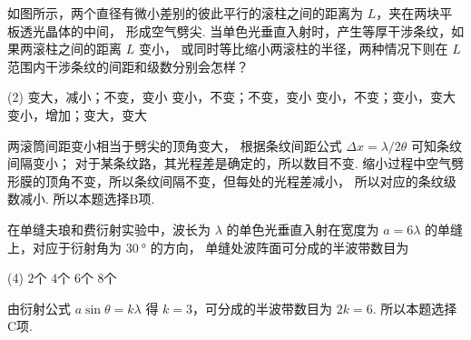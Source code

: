 \begin{textfig}
  \begin{problem}
    如图所示，两个直径有微小差别的彼此平行的滚柱之间的距离为 $L$，夹在两块平板透光晶体的中间，
    形成空气劈尖. 当单色光垂直入射时，产生等厚干涉条纹，如果两滚柱之间的距离 $L$ 变小，
    或同时等比缩小两滚柱的半径，两种情况下则在 $L$ 范围内干涉条纹的间距和级数分别会怎样？
      \begin{tasks}(2)
        \task 变大，减小；不变，变小
        \task[\true] 变小，不变；不变，变小
        \task 变小，不变；变小，变大
        \task 变小，增加；变大，变大
      \end{tasks}
    \end{problem}
    \textfigsplit\centering
\end{textfig}
\begin{solution}
  两滚筒间距变小相当于劈尖的顶角变大，
  根据条纹间距公式 $\Delta x = \lambda/2\theta$ 可知条纹间隔变小；
  对于某条纹路，其光程差是确定的，所以数目不变.
  缩小过程中空气劈形膜的顶角不变，所以条纹间隔不变，但每处的光程差减小，
  所以对应的条纹级数减小. 所以本题选择B项.
\end{solution}

\begin{problem}
  在单缝夫琅和费衍射实验中，波长为 $\lambda$ 的单色光垂直入射在宽度为
  $a = 6\lambda$ 的单缝上，对应于衍射角为 $\qty{30}\degree$ 的方向，
  单缝处波阵面可分成的半波带数目为
  \begin{tasks}(4)
    \task $2$个
    \task $4$个
    \task[\true] $6$个
    \task $8$个
  \end{tasks}
\end{problem}
\begin{solution}
  由衍射公式 $a\sin\theta = k\lambda$ 得 $k = 3$，可分成的半波带数目为 $2k = 6$.
  所以本题选择C项.
\end{solution}

